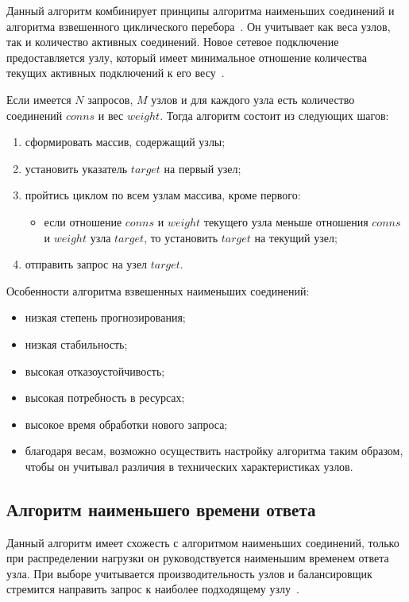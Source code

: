 Данный алгоритм комбинирует принципы алгоритма наименьших соединений и алгоритма взвешенного циклического перебора~\cite{part_algos}.
Он учитывает как веса узлов, так и количество активных соединений. 
Новое сетевое подключение предоставляется узлу, который имеет минимальное отношение количества текущих активных подключений к его весу~\cite{mainsource}.

Если имеется $N$ запросов, $M$ узлов и для каждого узла есть количество соединений $conns$ и вес $weight$.
Тогда алгоритм состоит из следующих шагов:
\begin{enumerate}
	\item сформировать массив, содержащий узлы;
	\item установить указатель $target$ на первый узел;
	\item пройтись циклом по всем узлам массива, кроме первого:
	\begin{itemize}
	\item если отношение $conns$ и $weight$ текущего узла меньше отношения $conns$ и $weight$ узла $target$, то установить $target$ на текущий узел; 
	\end{itemize}
	\item отправить запрос на узел $target$.
\end{enumerate}

Особенности алгоритма взвешенных наименьших соединений:
\begin{itemize}
	\item низкая степень прогнозирования; 
	\item низкая стабильность;
	\item высокая отказоустойчивость;
	\item высокая потребность в ресурсах;
	\item высокое время обработки нового запроса;
	\item благодаря весам, возможно осуществить настройку алгоритма таким образом, чтобы он учитывал различия в технических характеристиках узлов.
\end{itemize}


\subsection{Алгоритм наименьшего времени ответа}

Данный алгоритм имеет схожесть с алгоритмом наименьших соединений, только при распределении нагрузки он руководствуется наименьшим временем ответа узла.
При выборе учитывается производительность узлов и балансировщик стремится направить запрос к наиболее подходящему узлу~\cite{aws}.

